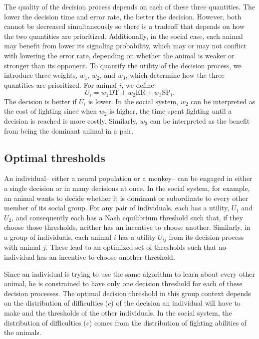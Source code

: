 \documentclass{article}
\begin{document}
The quality of the decision process depends on each of these three quantities.  The lower the decision time and error rate, the better the decision.  However, both cannot be decreased simultaneously so there is a tradeoff that depends on how the two quantities are prioritized.  Additionally, in the social case, each animal may benefit from lower its signaling probability, which may or may not conflict with lowering the error rate, depending on whether the animal is weaker or stronger than its opponent.  To quantify the utility of the decision process, we introduce three weights, $w_1$, $w_2$, and $w_3$, which determine how the three quantities are prioritized.  For animal $i$, we define
\begin{equation*}
U_{i}=w_1\text{DT}+w_2\text{ER}+w_3\text{SP}_i.
\end{equation*}
The decision is better if $U_i$ is lower.  In the social system, $w_2$ can be interpreted as the cost of fighting since when $w_2$ is higher, the time spent fighting until a decision is reached is more costly.  Similarly, $w_3$ can be interpreted as the benefit from being the dominant animal in a pair.



\subsection{Optimal thresholds }
An individual-- either a neural population or a monkey-- can be engaged in either a single decision or in many decisions at once.  In the social system, for example, an animal wants to decide whether it is dominant or subordinate to every other member of its social group.  For any pair of individuals, each has a utility, $U_1$ and $U_2$, and consequently each has a Nash equilibrium threshold such that, if they choose those thresholds, neither has an incentive to choose another.  Similarly, in a group of individuals, each animal $i$ has a utility $U_{ij}$ from its decision process with animal $j$.  These lead to an optimized set of thresholds such that no individual has an incentive to choose another threshold.

Since an individual is trying to use the same algorithm to learn about every other animal, he is constrained to have only one decision threshold for each of these decision processes.  The optimal decision threshold in this group context depends on the distribution of difficulties ($c$) of the decision an individual will have to make and the thresholds of the other individuals.  In the social system, the distribution of difficulties ($c$) comes from the distribution of fighting abilities of the animals.  
\end{document}

